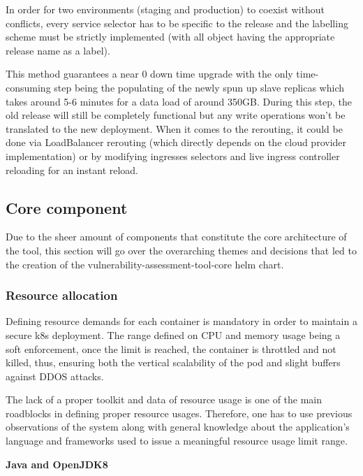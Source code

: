 \documentclass[11pt]{article}
\begin{document}
\newpage
In order for two environments (staging and production) to coexist without conflicts, every service selector has to be specific to the release and the labelling scheme must be strictly implemented (with all object having the appropriate release name as a label).

This method guarantees a near 0 down time upgrade with the only time-consuming step being the populating of the newly spun up slave replicas which takes around 5-6 minutes for a data load of around 350GB. During this step, the old release will still be completely functional but any write operations won't be translated to the new deployment. When it comes to the rerouting, it could be done via LoadBalancer rerouting (which directly depends on the cloud provider implementation) or by modifying ingresses selectors and live ingress controller reloading for an instant reload. 

\vspace{5mm} 
\subsection{Core component}

\hspace{5mm} Due to the sheer amount of components that constitute the core architecture of the tool, this section will go over the overarching themes and decisions that led to the creation of the vulnerability-assessment-tool-core helm chart.

\subsubsection{Resource allocation}

\hspace{5mm} Defining resource demands for each container is mandatory in order to maintain a secure k8s deployment. The range defined on CPU and memory usage being a soft enforcement, once the limit is reached, the container is throttled and not killed, thus, ensuring both the vertical scalability of the pod and slight buffers against DDOS attacks. 

The lack of a proper toolkit and data of resource usage is one of the main roadblocks in defining proper resource usages. Therefore, one has to use previous observations of the system along with general knowledge about the application's language and frameworks used to issue a meaningful resource usage limit range. 

\vspace{3mm}
\textbf{Java and OpenJDK8}
\end{document}
